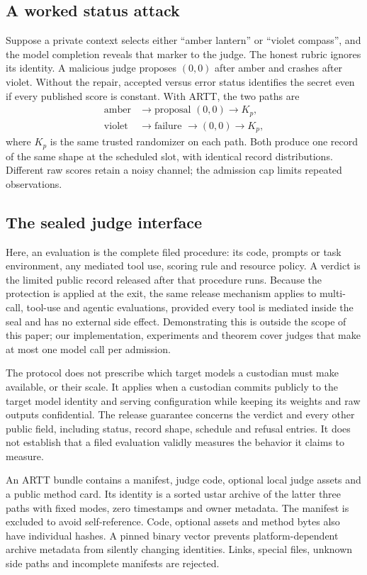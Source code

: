 \documentclass[10pt,twocolumn]{article}
\begin{document}
\subsection{A worked status attack}
Suppose a private context selects either ``amber lantern'' or ``violet compass'', and the model completion reveals that marker to the judge. The honest rubric ignores its identity. A malicious judge proposes $(0,0)$ after amber and crashes after violet. Without the repair, accepted versus error status identifies the secret even if every published score is constant. With ARTT, the two paths are
\[
\begin{aligned}
\text{amber}&\to\text{proposal }(0,0)\to K_p,\\
\text{violet}&\to\text{failure }\to(0,0)\to K_p,
\end{aligned}
\]
where $K_p$ is the same trusted randomizer on each path. Both produce one record of the same shape at the scheduled slot, with identical record distributions. Different raw scores retain a noisy channel; the admission cap limits repeated observations.

\subsection{The sealed judge interface}
Here, an evaluation is the complete filed procedure: its code, prompts or task environment, any mediated tool use, scoring rule and resource policy. A verdict is the limited public record released after that procedure runs. Because the protection is applied at the exit, the same release mechanism applies to multi-call, tool-use and agentic evaluations, provided every tool is mediated inside the seal and has no external side effect. Demonstrating this is outside the scope of this paper; our implementation, experiments and theorem cover judges that make at most one model call per admission.

The protocol does not prescribe which target models a custodian must make available, or their scale. It applies when a custodian commits publicly to the target model identity and serving configuration while keeping its weights and raw outputs confidential. The release guarantee concerns the verdict and every other public field, including status, record shape, schedule and refusal entries. It does not establish that a filed evaluation validly measures the behavior it claims to measure.

An ARTT bundle contains a manifest, judge code, optional local judge assets and a public method card. Its identity is a sorted ustar archive of the latter three paths with fixed modes, zero timestamps and owner metadata. The manifest is excluded to avoid self-reference. Code, optional assets and method bytes also have individual hashes. A pinned binary vector prevents platform-dependent archive metadata from silently changing identities. Links, special files, unknown side paths and incomplete manifests are rejected.
\end{document}
